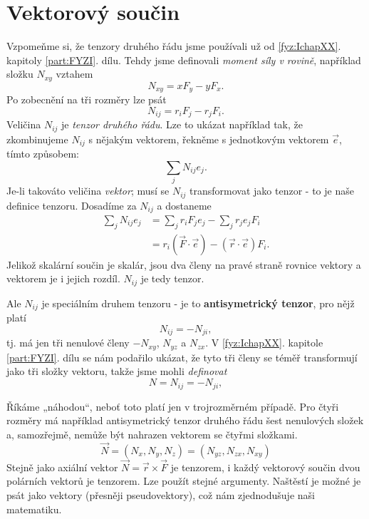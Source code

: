   \section{Vektorový součin}\label{fyz:IIchapXXXIsecV}   
    Vzpomeňme si, že tenzory druhého řádu jsme používali už od \ref{fyz:IchapXX}. kapitoly
    \ref{part:FYZI}. dílu. Tehdy jsme definovali \emph{moment síly v rovině}, například složku
    \(N_{xy}\) vztahem 
    \begin{equation*}
      N_{xy} = xF_y-yF_x.
    \end{equation*}
    Po zobecnění na tři rozměry lze psát
    \begin{equation}\label{fyz:eq947}
      N_{ij} = r_iF_j-r_jF_i.
    \end{equation}
    Veličina \(N_{ij}\) je \emph{tenzor druhého řádu}. Lze to ukázat například tak, že zkombinujeme
    \(N_{ij}\) s nějakým vektorem, řekněme s jednotkovým vektorem \(\vec{e}\), tímto způsobem:
    \begin{equation*}
      \sum_jN_{ij}e_j.
    \end{equation*}
    Je-li takováto veličina \emph{vektor}; musí se \(N_{ij}\) transformovat jako tenzor - to je naše
    definice tenzoru. Dosadíme za \(N_{ij}\) a dostaneme
    \begin{align*}
      \sum_jN_{ij}e_j
        &=\sum_jr_iF_je_j-\sum_jr_je_jF_i           \\[1ex]
        &=r_i(\vec{F}\cdot\vec{e})-(\vec{r}\cdot\vec{e})F_i.
    \end{align*}
    Jelikož skalární součin je skalár, jsou dva členy na pravé straně rovnice vektory a vektorem je
    i jejich rozdíl. \(N_{ij}\) je tedy tenzor.

    Ale \(N_{ij}\) je speciálním druhem tenzoru - je to \textbf{antisymetrický tenzor}, pro nějž
    platí
    \begin{equation*}
      N_{ij}=-N_{ji},
    \end{equation*}
    tj. má jen tři nenulové členy \(-N_{xy}\), \(N_{yz}\) a \(N_{zx}\). V \ref{fyz:IchapXX}.
    kapitole \ref{part:FYZI}. dílu se nám podařilo ukázat, že tyto tři členy se téměř 
    transformují jako tři složky vektoru, takže jsme mohli \emph{definovat}
    \begin{equation*}
      N = N_{ij}=-N_{ji},
    \end{equation*}
    
    Říkáme „náhodou“, neboť toto platí jen v trojrozměrném případě. Pro čtyři rozměry má například
    antisymetrický tenzor druhého řádu šest nenulových složek a, samozřejmě, nemůže být nahrazen
    vektorem se čtyřmi složkami.
    \begin{equation*}
      \vec{N}=(N_x,N_y,N_z)=(N_{yz},N_{zx},N_{xy})
      \end{equation*}
    Stejně jako axiální vektor \(\vec{N}=\vec{r}\times\vec{F}\) je tenzorem, i každý vektorový
    součin dvou polárních vektorů je tenzorem. Lze použít stejné argumenty. Naštěstí je možné je
    psát jako vektory (přesněji pseudovektory), což nám zjednodušuje naši matematiku.
    
